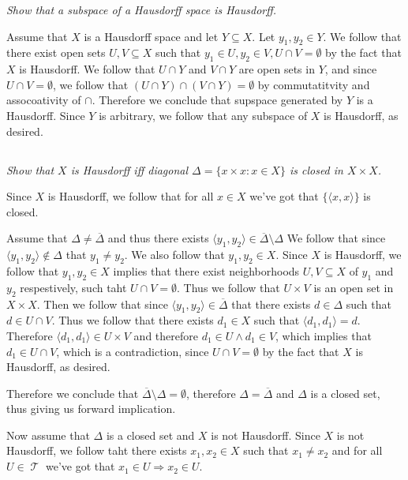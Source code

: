 \documentclass[11pt,oneside,titlepage]{book}
\DeclareMathOperator \topol {\mathcal {T}}
\DeclareMathOperator \ra {\Rightarrow}
\newcommand{\eangle}[1]{\langle #1 \rangle}
\newcommand{\set}[1]{\{ #1 \}}
\begin{document}
\textit{Show that a subspace of a Hausdorff space is Hausdorff.}

Assume that $X$ is a Hausdorff space and let $Y \subseteq X$. Let $y_1, y_2 \in Y$.
We follow that there exist open sets $U, V \subseteq X$ such that
$y_1 \in U, y_2 \in V, U \cap V = \emptyset$ by the fact that $X$ is Hausdorff.
We follow that $U \cap Y$ and $V \cap Y$ are open sets in $Y$, and since
$U \cap V = \emptyset$, we follow that $(U \cap Y) \cap (V \cap Y) = \emptyset$
by commutatitvity and assocoativity of $\cap$. Therefore we conclude that
supspace generated by $Y$ is a Hausdorff. Since $Y$ is arbitrary, we follow that
any subspace of $X$ is Hausdorff, as desired.

\subsection{}

\textit{Show that $X$ is Hausdorff iff diagonal $\Delta = \set{x \times x: x \in X}$
  is closed in $X \times X$.}

Since $X$ is Hausdorff, we follow that for all $x \in X$ we've got that $\set{\eangle{x, x}}$
is closed.

Assume that $\Delta \neq \overline{\Delta}$ and thus there exists
$\eangle{y_1, y_2} \in \overline{\Delta} \setminus \Delta$
We follow that since $\eangle{y_1, y_2} \notin \Delta$ that $y_1 \neq y_2$. We also
follow that $y_1, y_2 \in X$. Since $X$ is Hausdorff, we follow that
$y_1, y_2 \in X$ implies that there exist neighborhoods $U, V \subseteq X$ of $y_1$
and $y_2$ respestively, such taht $U \cap V = \emptyset$. Thus
we follow that $U \times V$ is an open set in $X \times X$.
Then we follow that since $\eangle{y_1, y_2} \in \overline{\Delta}$ that
there exists $d \in \Delta$ such that $d \in U \cap V$. Thus we follow that
there exists $d_1 \in X$ such that $\eangle{d_1, d_1} = d$. Therefore
$\eangle{d_1, d_1} \in U \times V$ and therefore $d_1 \in U \land d_1 \in V$,
which implies that $d_1 \in U \cap V$, which is a contradiction, since $U \cap V = \emptyset$
by the fact that $X$ is Hausdorff, as desired.

Therefore we conclude that $\overline \Delta \setminus \Delta = \emptyset$, therefore
$\Delta = \overline{\Delta}$ and $\Delta$ is a closed set, thus giving us forward
implication.

Now assume that $\Delta$ is a closed set and $X$ is not Hausdorff. Since $X$
is not Hausdorff, we follow taht there exists $x_1, x_2 \in X$ such that
$x_1 \neq x_2$ and
for all $U \in \topol$ we've got that $x_1 \in U \ra x_2 \in U$.
\end{document}
